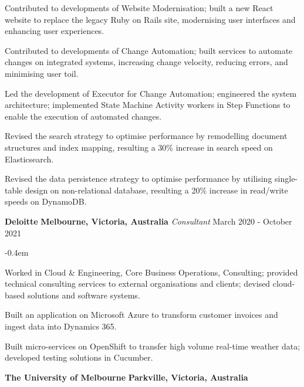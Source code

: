 \documentclass{cv}
\begin{document}
\begin{list}{}{\setlength{\leftmargin}{0em}}
\begin{list}{\raisebox{0.2em}{\tiny$\bullet$} \hspace{0em}}{\setlength{\leftmargin}{2.0em}}
        \item Contributed to developments of Website Modernisation; built a new React website to replace the legacy Ruby on Rails site, modernising user interfaces and enhancing user experiences.
        \item Contributed to developments of Change Automation; built services to automate changes on integrated systems, increasing change velocity, reducing errors, and minimising user toil.
        \item Led the development of Executor for Change Automation; engineered the system architecture; implemented State Machine Activity workers in Step Functions to enable the execution of automated changes.
        \item Revised the search strategy to optimise performance by remodelling document structures and index mapping, resulting a 30\% increase in search speed on Elasticsearch.
        \item Revised the data persistence strategy to optimise performance by utilising single-table design on non-relational database, resulting a 20\% increase in read/write speeds on DynamoDB.
    \end{list}
\item
    \textbf{Deloitte} \hfill \textbf{Melbourne, Victoria, Australia}%
    \vspace{0.1em} \newline 
    {\textit{Consultant}} \hfill {March 2020 - October 2021}%
    \begin{list}{\raisebox{0.2em}{\tiny$\bullet$} \hspace{0em}}{\setlength{\leftmargin}{2.0em}}
        \itemsep -0.4em \vspace{-0.4em}
        \item Worked in Cloud \& Engineering, Core Business Operations, Consulting; provided technical consulting services to external organisations and clients; devised cloud-based solutions and software systems.
        \item Built an application on Microsoft Azure to transform customer invoices and ingest data into Dynamics 365.
        \item Built micro-services on OpenShift to transfer high volume real-time weather data; developed testing solutions in Cucumber.
    \end{list}
\item
    \textbf{The University of Melbourne} \hfill \textbf{Parkville, Victoria, Australia}%
    \vspace{0.1em} \newline 

\end{list}
\end{document}

